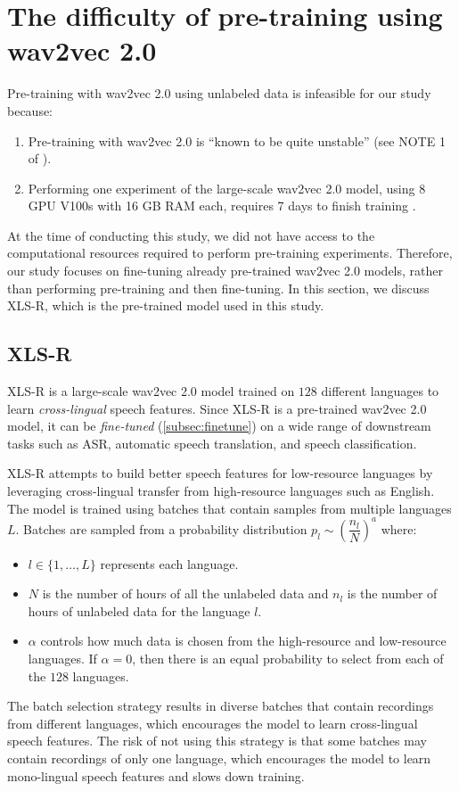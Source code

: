 \section{The difficulty of pre-training using wav2vec 2.0}
Pre-training with wav2vec 2.0 using unlabeled data is infeasible for our study because:
\begin{enumerate}
    \item Pre-training with wav2vec 2.0 is ``known to be quite unstable'' (see NOTE 1 of \cite{vonplaten2021pretraining}).
    \item Performing one experiment of the large-scale wav2vec 2.0 model, using 8 GPU V100s with 16 GB RAM each, requires 7 days to finish training \cite{vonplaten2021pretraining}.
\end{enumerate}
At the time of conducting this study, we did not have access to the computational resources required to perform pre-training experiments.
Therefore, our study focuses on fine-tuning already pre-trained wav2vec 2.0 models, rather than performing pre-training and then fine-tuning.
In this section, we discuss XLS-R, which is the pre-trained model used in this study.

\subsection{XLS-R}
XLS-R \cite{babu2021xls} is a large-scale wav2vec 2.0 model trained on $128$ different languages to learn \emph{cross-lingual} speech features.
Since XLS-R is a pre-trained wav2vec 2.0 model, it can be \emph{fine-tuned} (\ref{subsec:finetune}) on a wide range of downstream tasks such as ASR, automatic speech translation, and speech classification.

XLS-R attempts to build better speech features for low-resource languages by leveraging cross-lingual transfer from high-resource languages such as English.
The model is trained using batches that contain samples from multiple languages $L$. 
Batches are sampled from a probability distribution $p_l \sim \left(\dfrac{n_l}{N}\right)^{a}$ where:
\begin{itemize}
    \item $l \in \{1, \dots, L\}$ represents each language.
    \item $N$ is the number of hours of all the unlabeled data and $n_l$ is the number of hours of unlabeled data for the language $l$.
    \item $\alpha$ controls how much data is chosen from the high-resource and low-resource languages. If $\alpha = 0$, then there is an equal probability to select from each of the $128$ languages. 
\end{itemize}
The batch selection strategy results in diverse batches that contain recordings from different languages, which encourages the model to learn cross-lingual speech features.
The risk of not using this strategy is that some batches may contain recordings of only one language, which encourages the model to learn mono-lingual speech features and slows down training.


